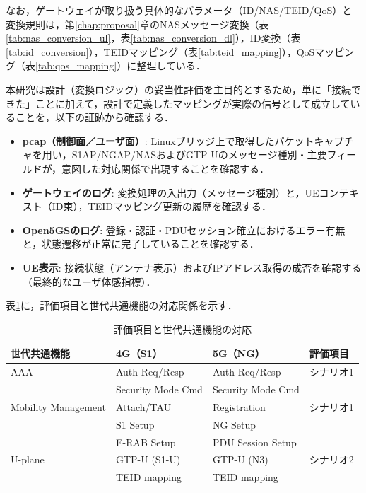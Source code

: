なお，ゲートウェイが取り扱う具体的なパラメータ（ID/NAS/TEID/QoS）と変換規則は，第\ref{chap:proposal}章のNASメッセージ変換（表\ref{tab:nas_conversion_ul}，表\ref{tab:nas_conversion_dl}），ID変換（表\ref{tab:id_conversion}），TEIDマッピング（表\ref{tab:teid_mapping}），QoSマッピング（表\ref{tab:qos_mapping}）に整理している．

本研究は設計（変換ロジック）の妥当性評価を主目的とするため，単に「接続できた」ことに加えて，設計で定義したマッピングが実際の信号として成立していることを，以下の証跡から確認する．
\begin{itemize}
    \item \textbf{pcap（制御面／ユーザ面）}: Linuxブリッジ上で取得したパケットキャプチャを用い，S1AP/NGAP/NASおよびGTP-Uのメッセージ種別・主要フィールドが，意図した対応関係で出現することを確認する．
    \item \textbf{ゲートウェイのログ}: 変換処理の入出力（メッセージ種別）と，UEコンテキスト（ID束），TEIDマッピング更新の履歴を確認する．
    \item \textbf{Open5GSのログ}: 登録・認証・PDUセッション確立におけるエラー有無と，状態遷移が正常に完了していることを確認する．
    \item \textbf{UE表示}: 接続状態（アンテナ表示）およびIPアドレス取得の成否を確認する（最終的なユーザ体感指標）．
\end{itemize}

表\ref{tab:generation_invariant_mapping}に，評価項目と世代共通機能の対応関係を示す．

\begin{table}[htbp]
\centering
\caption{評価項目と世代共通機能の対応}
\label{tab:generation_invariant_mapping}
\begin{tabular}{|l|l|l|l|}
\hline
\textbf{世代共通機能} & \textbf{4G（S1）} & \textbf{5G（NG）} & \textbf{評価項目} \\
\hline
AAA & Auth Req/Resp & Auth Req/Resp & シナリオ1 \\
& Security Mode Cmd & Security Mode Cmd & \\
\hline
Mobility Management & Attach/TAU & Registration & シナリオ1 \\
& S1 Setup & NG Setup & \\
& E-RAB Setup & PDU Session Setup & \\
\hline
U-plane & GTP-U (S1-U) & GTP-U (N3) & シナリオ2 \\
& TEID mapping & TEID mapping & \\
\hline
\end{tabular}
\end{table}

